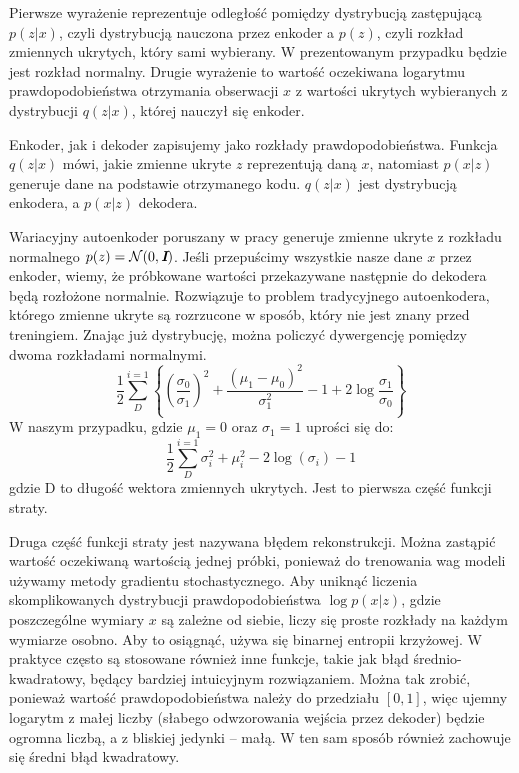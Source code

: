 \documentclass[a4paper,12pt,oneside]{book} %
\begin{document}
Pierwsze wyrażenie reprezentuje odległość pomiędzy dystrybucją zastępującą $p(z|x)$, czyli dystrybucją nauczona przez enkoder a $p(z)$, czyli rozkład zmiennych ukrytych, który sami wybierany. W prezentowanym przypadku będzie jest rozkład normalny. Drugie wyrażenie to wartość oczekiwana logarytmu prawdopodobieństwa otrzymania obserwacji $x$ z wartości ukrytych wybieranych z dystrybucji $q(z|x)$, której nauczył się enkoder.

Enkoder, jak i dekoder zapisujemy jako rozkłady prawdopodobieństwa. Funkcja $q(z|x)$ mówi, jakie zmienne ukryte $z$ reprezentują daną $x$, natomiast $p(x|z)$ generuje dane na podstawie otrzymanego kodu. $q(z|x)$ jest dystrybucją enkodera, a $p(x|z)$ dekodera.

Wariacyjny autoenkoder poruszany w pracy generuje zmienne ukryte z rozkładu normalnego $p(z)=\mathcal{N}(0,\textit{\textbf{I}})$. Jeśli przepuścimy wszystkie nasze dane $x$ przez enkoder, wiemy, że próbkowane wartości przekazywane następnie do dekodera będą rozłożone normalnie. Rozwiązuje to problem tradycyjnego autoenkodera, którego zmienne ukryte są rozrzucone w sposób, który nie jest znany przed treningiem. Znając już dystrybucję, można policzyć dywergencję pomiędzy dwoma rozkładami normalnymi.
\begin{equation}
	\dfrac{1}{2}\displaystyle\sum_{D}^{i=1}\left\{\left(\dfrac{\sigma_0}{\sigma_1}\right)^2+\dfrac{(\mu_1 - \mu_0)^2}{\sigma_1^2} - 1 + 2\log\dfrac{\sigma_1}{\sigma_0}\right\}
	\label{equ:kldnormals}
\end{equation}
W naszym przypadku, gdzie $\mu_1 = 0$ oraz $\sigma_1=1$ uprości się do:
\begin{equation}
	\dfrac{1}{2}\displaystyle\sum_{D}^{i=1}\sigma_i^2+\mu_i^2-2\log(\sigma_i)-1
	\label{equ:kld_loss}
\end{equation} 
gdzie D to długość wektora zmiennych ukrytych. Jest to pierwsza część funkcji straty. 

Druga część funkcji straty jest nazywana błędem rekonstrukcji. Można zastąpić wartość oczekiwaną wartością jednej próbki, ponieważ do trenowania wag modeli używamy metody gradientu stochastycznego. Aby uniknąć liczenia skomplikowanych dystrybucji prawdopodobieństwa $\log p(x|z)$, gdzie poszczególne wymiary $x$ są zależne od siebie, liczy się proste rozkłady na każdym wymiarze osobno. Aby to osiągnąć, używa się binarnej entropii krzyżowej. W praktyce często są stosowane również inne funkcje, takie jak błąd średnio-kwadratowy, będący bardziej intuicyjnym rozwiązaniem.
Można tak zrobić, ponieważ wartość prawdopodobieństwa należy do przedziału $\left[ 0, 1\right] $, więc ujemny logarytm z małej liczby (słabego odwzorowania wejścia przez dekoder) będzie ogromna liczbą, a z bliskiej jedynki -- małą. W ten sam sposób również zachowuje się średni błąd kwadratowy.
\newpage
\end{document}
